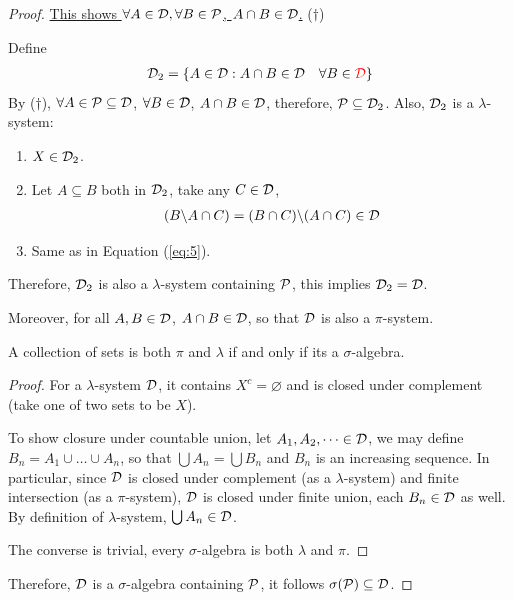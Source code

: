 \documentclass[11pt]{article}
\begin{document}
\begin{theorem}
\begin{proof}
			\ul{This shows $\forall A \in \mathcal{{D}}, \forall B \in \mathcal{{P}}$, $A \cap B \in \mathcal{{D}}$.} ($\dagger$)
			
			Define
			\begin{align}
				\mathcal{{D}}_2 = \{A \in \mathcal{{D}} : A \cap B \in \mathcal{{D}}\quad \forall B \in \textcolor{red}{\mathcal{{D}}}\}
			\end{align}
			By ($\dagger$), $\forall A \in \mathcal{{P}} \subseteq \mathcal{{D}}$, $\forall B \in \mathcal{{D}}$, $A \cap B \in \mathcal{{D}}$, therefore, $\mathcal{{P}} \subseteq \mathcal{{D}}_2$. Also, $\mathcal{{D}}_2$ is a $\lambda$-system:
			\begin{enumerate}
				\item $X \in \mathcal{{D}}_2$.
				\item Let $A \subseteq B$ both in $\mathcal{{D}}_2$, take any $C \in \mathcal{{D}}$,
				\begin{align}
					(B \backslash A \cap C) = (B \cap C) \backslash (A \cap C) \in \mathcal{{D}}
				\end{align}
				\item Same as in Equation (\ref{eq:5}).
			\end{enumerate}
			Therefore, $\mathcal{{D}}_2$ is also a $\lambda$-system containing $\mathcal{{P}}$, this implies $\mathcal{{D}}_2 = \mathcal{{D}}$.
			
			Moreover, for all $A, B \in \mathcal{{D}}$, $A \cap B \in \mathcal{{D}}$, so that $\mathcal{{D}}$ is also a $\pi$-system.
			\begin{tcolorbox}
				\begin{lemma}
					A collection of sets is both $\pi$ and $\lambda$ if and only if its a $\sigma$-algebra.
				\end{lemma}
				\begin{proof}
					For a $\lambda$-system $\mathcal{{D}}$, it contains $X^c = \varnothing$ and is closed under complement (take one of two sets to be $X$).
					
					To show closure under countable union, let $A_1, A_2, \dots \in \mathcal{{D}}$, we may define $B_n = A_1 \cup \dots \cup A_n$, so that $\bigcup A_n = \bigcup B_n$ and $B_n$ is an increasing sequence. In particular, since $\mathcal{{D}}$ is closed under complement (as a $\lambda$-system) and finite intersection (as a $\pi$-system), $\mathcal{{D}}$ is closed under finite union, each $B_n \in \mathcal{{D}}$ as well.
					By definition of $\lambda$-system, $\bigcup A_n \in \mathcal{{D}}$.
					
					The converse is trivial, every $\sigma$-algebra is both $\lambda$ and $\pi$.
				\end{proof}
			\end{tcolorbox}
			Therefore, $\mathcal{{D}}$ is a $\sigma$-algebra containing $\mathcal{{P}}$, it follows $\sigma(\mathcal{{P}}) \subseteq \mathcal{{D}}$.
		\end{proof}
	\end{theorem}
	
\end{document}
